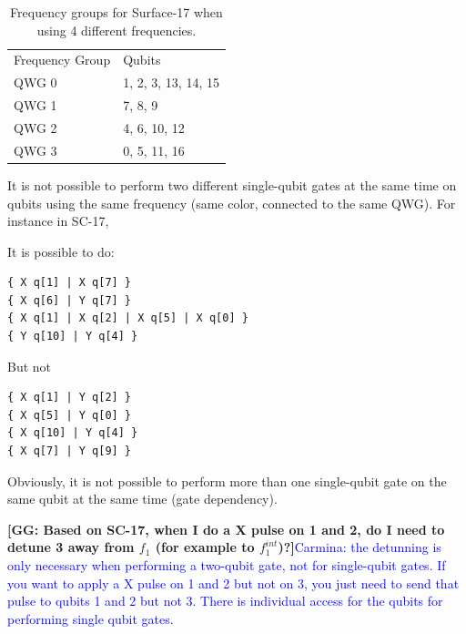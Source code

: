 \documentclass[11pt]{article}
\def\noteGG#1{\textbf{\color{red}[GG: #1]}}
\begin{document}
\begin{table}[h!]


\caption{\label{T3}
Frequency groups for Surface-17 when using 4 different frequencies.}
\centering
\begin{tabular}{ll}
 & \\
\hline
Frequency Group & Qubits\\
\hline
\cellcolor{red!25} QWG 0 & \cellcolor{red!25} 1, 2, 3, 13, 14, 15\\
\cellcolor{pink!25} QWG 1 & \cellcolor{pink!25} 7, 8, 9\\
\cellcolor{green!25} QWG 2 & \cellcolor{green!25} 4, 6, 10, 12\\
\cellcolor{cyan!25} QWG 3 & \cellcolor{cyan!25} 0, 5, 11, 16\\
\hline
\end{tabular}
\end{table}


\newpage
It is not possible to perform two different single-qubit gates at the same time on qubits using the same frequency (same color, connected to the same QWG). For instance in SC-17,

\begin{minipage}[t]{.45\textwidth}

It is possible to do:

\begin{verbatim}
{ X q[1] | X q[7] }
{ X q[6] | Y q[7] }
{ X q[1] | X q[2] | X q[5] | X q[0] }
{ Y q[10] | Y q[4] }

\end{verbatim}

\end{minipage}
\hfill %
\begin{minipage}[t]{.45\textwidth}

But not

\begin{verbatim}
{ X q[1] | Y q[2] }
{ X q[5] | Y q[0] }
{ X q[10] | Y q[4] }
{ X q[7] | Y q[9] }
\end{verbatim}

\end{minipage}

Obviously, it is not possible to perform more than one single-qubit gate on the same qubit at the same time (gate dependency).

\noteGG{Based on SC-17, when I do a X pulse on 1 and 2, do I need to detune 3 away from $f_1$ (for example to $f_{1}^{int}$)?}\textcolor{blue}{Carmina: the detunning is only necessary when performing a two-qubit gate, not for single-qubit gates. If you want to apply a X pulse on 1 and 2 but not on 3, you just need to send that pulse to qubits 1 and 2 but not 3. There is individual access for the qubits for performing single qubit gates.}
\end{document}
